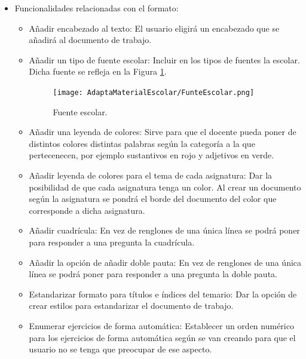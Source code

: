 \begin{itemize}
  \item Funcionalidades relacionadas con el formato:
        \begin{itemize}
          \item Añadir encabezado al texto: El usuario eligirá un encabezado que se añadirá al documento de trabajo.
          \item Añadir un tipo de fuente escolar: Incluir en los tipos de fuentes la escolar. Dicha fuente se refleja en la Figura \ref{escolar}.
                \begin{figure}[ht!]
                  \centering
                  \texttt{[image: AdaptaMaterialEscolar/FunteEscolar.png]}
                  \caption{Fuente escolar.}
                  \label{escolar}
                \end{figure}
          \item Añadir una leyenda de colores: Sirve para que el docente pueda poner de distintos colores distintas palabras según la categoría a la que pertecenecen, por ejemplo sustantivos en rojo y adjetivos en verde.
          \item Añadir leyenda de colores para el tema de cada asignatura: Dar la posibilidad de que cada asignatura tenga un color. Al crear un documento según la asignatura se pondrá el borde del documento del color que corresponde a dicha asignatura.
          \item Añadir cuadrícula: En vez de renglones de una única línea se podrá poner para responder a una pregunta la cuadrícula.
          \item Añadir la opción de añadir doble pauta: En vez de renglones de una única línea se podrá poner para responder a una pregunta la doble pauta.
          \item Estandarizar formato para títulos e índices del temario: Dar la opción de crear estilos para estandarizar el documento de trabajo.
          \item Enumerar ejercicios de forma automática: Establecer un orden numérico para los ejercicios de forma automática según se van creando para que el usuario no se tenga que preocupar de ese aspecto.
        \end{itemize}


\end{itemize}
